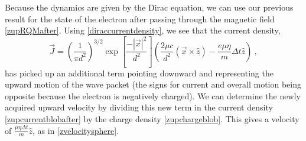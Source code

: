 \documentclass[onecolumn,secnumarabic,amsmath,amssymb,balancelastpage,nofootinbib]{article}
\begin{document}
Because the dynamics are given by the Dirac equation, we can use our previous result for the state of the electron after passing through the magnetic field \eqref{zupRQMafter}.  Using \eqref{diraccurrentdensity}, we see that the current density,
\begin{equation}
\vec{J}=\left(\frac{1}{\pi d^2}\right)^{3/2} \exp\left[\frac{-|\vec{x}|^2}{d^2}\right]\left( \frac{2\mu c}{d^2} (\vec{x} \times \hat{z}) - \frac{e \mu \eta}{m}\Delta t \hat{z} \right)
\ ,
\label{zupcurrentblobafter}
\end{equation}
has picked up an additional term pointing downward and representing the upward motion of the wave packet (the signs for current and overall motion being opposite because the electron is negatively charged).  We can determine the newly acquired upward velocity by dividing this new term in the current density \eqref{zupcurrentblobafter} by the charge density \eqref{zupchargeblob}.  This gives a velocity of $\frac{\mu \eta \Delta t}{m} \hat{z}$, as in \eqref{zvelocitysphere}.
\end{document}

